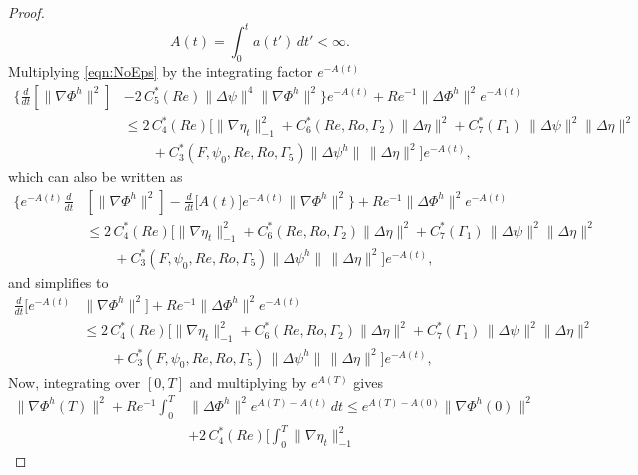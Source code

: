 \begin{proof}
  \begin{equation}
    A(t) = \int_{0}^{t}\! a(t')\, dt' < \infty.
    \label{eqn:L4Bound}
  \end{equation}
  Multiplying \eqref{eqn:NoEps} by the integrating factor $e^{-A(t)}$
  \begin{align*}
    \biggl\{ \frac{d}{dt}\left[\|\nabla \Phi^h\|^2\right]
      &- 2\, C^*_5(Re) \|\Delta \psi\|^4 \|\nabla \Phi^h\|^2\biggr\} e^{-A(t)}
        + Re^{-1} \|\Delta \Phi^h\|^2 e^{-A(t)} \\
      & \le 2\, C^*_4(Re) \biggl[\|\nabla \eta_t\|_{-1}^2
        + C^*_6(Re,Ro,\Gamma_2) \|\Delta \eta\|^2 + C^*_7(\Gamma_1)\,
        \|\Delta \psi\|^2 \|\Delta \eta\|^2 \\
      & \qquad+ C^*_3(F,\psi_0,Re,Ro,\Gamma_5) \|\Delta \psi^h\|\, \|\Delta
        \eta\|^2\biggr] e^{-A(t)},
  \end{align*}
  which can also be written as
  \begin{align*}
    \biggl\{ e^{-A(t)}\frac{d}{dt}
      & \left[\|\nabla \Phi^h\|^2\right]
      - \frac{d}{dt}\bigl[ A(t)\bigr] e^{-A(t)} \|\nabla \Phi^h\|^2\biggr\}
      + Re^{-1} \|\Delta \Phi^h\|^2 e^{-A(t)} \\
    & \le 2\,C^*_4(Re) \biggl[\|\nabla \eta_t\|_{-1}^2
      + C^*_6(Re,Ro,\Gamma_2) \|\Delta \eta\|^2 + C^*_7(\Gamma_1)\,
      \|\Delta \psi\|^2 \|\Delta \eta\|^2 \\
    &\qquad + C^*_3(F,\psi_0,Re,Ro,\Gamma_5) \|\Delta \psi^h\|\, \|\Delta
      \eta\|^2\biggr] e^{-A(t)},
  \end{align*}
  and simplifies to
  \begin{align*}
    \frac{d}{dt}\bigl[e^{-A(t)} &\|\nabla \Phi^h\|^2\bigr]
      + Re^{-1} \|\Delta \Phi^h\|^2 e^{-A(t)} \\
    & \le 2\, C^*_4(Re) \biggl[\|\nabla \eta_t\|_{-1}^2
      + C^*_6(Re,Ro,\Gamma_2) \|\Delta \eta\|^2 + C^*_7(\Gamma_1)\,
      \|\Delta \psi\|^2 \|\Delta \eta\|^2 \\
    &\qquad + C^*_3(F,\psi_0,Re,Ro,\Gamma_5)\, \|\Delta \psi^h\|\,
      \|\Delta \eta\|^2\biggr] e^{-A(t)},
  \end{align*}
  Now, integrating over $[0,T]$ and multiplying by $e^{A(T)}$ gives
  \begin{equation}
    \begin{split}
      \|\nabla \Phi^h(T)\|^2 + Re^{-1} \int_0^T\! &\|\Delta \Phi^h\|^2
        e^{A(T) - A(t)}\, dt \le e^{A(T) - A(0)} \|\nabla \Phi^h(0)\|^2 \\
      & + 2\, C^*_4(Re)\biggl[ \int_0^T\! \|\nabla \eta_t\|_{-1}^2

\end{split}
\end{equation}
\end{proof}
